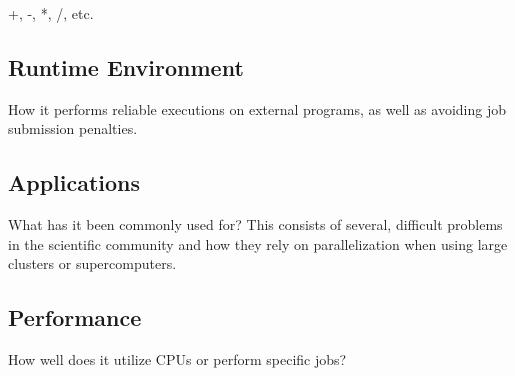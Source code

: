     +, -, *, /, etc.

\subsection{Runtime Environment}

How it performs reliable executions on external programs, as well as avoiding job submission penalties. \cite{wilde2011swift}

\subsection{Applications}

What has it been commonly used for? This consists of several, difficult problems in the scientific community and how they rely on parallelization when using large clusters or supercomputers. \cite{wilde2009parallel} \cite{hategan2011coasters}

\subsection{Performance}

How well does it utilize CPUs or perform specific jobs? \cite{wilde2011swift}
